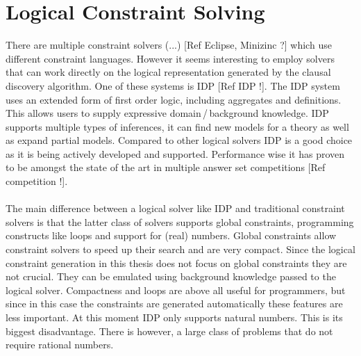 \section{Logical Constraint Solving}
\label{sec:logical_constraint_solving}
There are multiple constraint solvers (...) [Ref Eclipse, Minizinc ?] which use different constraint languages. However it seems interesting to employ solvers that can work directly on the logical representation generated by the clausal discovery algorithm. One of these systems is IDP [Ref IDP !]. The IDP system uses an extended form of first order logic, including aggregates and definitions. This allows users to supply expressive domain\,/\,background knowledge. IDP supports multiple types of inferences, it can find new models for a theory as well as expand partial models. Compared to other logical solvers IDP is a good choice as it is being actively developed and supported. Performance wise it has proven to be amongst the state of the art in multiple answer set competitions [Ref competition !].
\\\\
The main difference between a logical solver like IDP and traditional constraint solvers is that the latter class of solvers supports global constraints, programming constructs like loops and support for (real) numbers. Global constraints allow constraint solvers to speed up their search and are very compact. Since the logical constraint generation in this thesis does not focus on global constraints they are not crucial. They can be emulated using background knowledge passed to the logical solver. Compactness and loops are above all useful for programmers, but since in this case the constraints are generated automatically these features are less important. At this moment IDP only supports natural numbers. This is its biggest disadvantage. There is however, a large class of problems that do not require rational numbers.